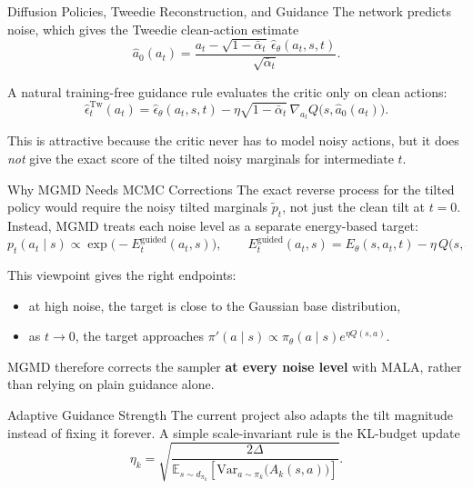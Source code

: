 \documentclass[final,hyperref={pdfpagelabels=false}]{beamer}
\newlength{\colwidth}
\newcommand{\E}{\mathbb{E}}
\newcommand{\Var}{\mathrm{Var}}
\begin{document}
\begin{frame}[t]
\begin{columns}[t]
\begin{column}{\colwidth}
\begin{block}{\Large Diffusion Policies, Tweedie Reconstruction, and Guidance}
\vspace{0.3em}
The network predicts noise, which gives the Tweedie clean-action estimate
\[
\hat a_0(a_t)=\frac{a_t-\sqrt{1-\bar\alpha_t}\,\hat\epsilon_\theta(a_t,s,t)}{\sqrt{\bar\alpha_t}}.
\]

\vspace{0.3em}
A natural training-free guidance rule evaluates the critic only on clean actions:
\[
\hat\epsilon_t^{\mathrm{Tw}}(a_t)
=
\hat\epsilon_\theta(a_t,s,t)
-
\eta\sqrt{1-\bar\alpha_t}\,\nabla_{a_t}Q\!\bigl(s,\hat a_0(a_t)\bigr).
\]

\vspace{0.3em}
This is attractive because the critic never has to model noisy actions, but it does \emph{not} give the exact score of the tilted noisy marginals for intermediate $t$.
\end{block}

\vspace{0.8cm}

\begin{block}{\Large Why MGMD Needs MCMC Corrections}
\small
The exact reverse process for the tilted policy would require the noisy tilted marginals $\tilde p_t$, not just the clean tilt at $t=0$.
Instead, MGMD treats each noise level as a separate energy-based target:
\[
p_t(a_t\mid s) \propto \exp\!\bigl(-E_t^{\mathrm{guided}}(a_t,s)\bigr),
\qquad
E_t^{\mathrm{guided}}(a_t,s)=E_\theta(s,a_t,t)-\eta\,Q\!\bigl(s,\hat a_0(a_t)\bigr).
\]

\vspace{0.3em}
This viewpoint gives the right endpoints:
\begin{itemize}
    \item at high noise, the target is close to the Gaussian base distribution,
    \item as $t \to 0$, the target approaches $\pi'(a\mid s) \propto \pi_\theta(a\mid s)e^{\eta Q(s,a)}$.
\end{itemize}

\vspace{0.3em}
MGMD therefore corrects the sampler \textbf{at every noise level} with MALA, rather than relying on plain guidance alone.
\end{block}

\vspace{0.8cm}

\begin{block}{\Large Adaptive Guidance Strength}
\small
The current project also adapts the tilt magnitude instead of fixing it forever. A simple scale-invariant rule is the KL-budget update
\[
\eta_k = \sqrt{\frac{2\Delta}{\E_{s\sim d_{\pi_k}}\!\left[\Var_{a\sim\pi_k}\bigl(A_k(s,a)\bigr)\right]}}.
\]


\end{block}
\end{column}
\end{columns}
\end{frame}
\end{document}
